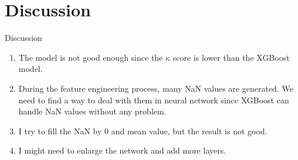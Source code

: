 
\section{Discussion}
\begin{frame}{Discussion}
\begin{enumerate}
    \item The model is not good enough since the $\kappa$ score is lower than the XGBoost model.
    \item During the feature engineering process, many NaN values are generated. We need to find a way to deal with them in neural network since XGBoost can handle NaN values without any problem.
    \item I try to fill the NaN by 0 and mean value, but the result is not good. 
    \item I might need to enlarge the network and add more layers.
\end{enumerate}
\end{frame}